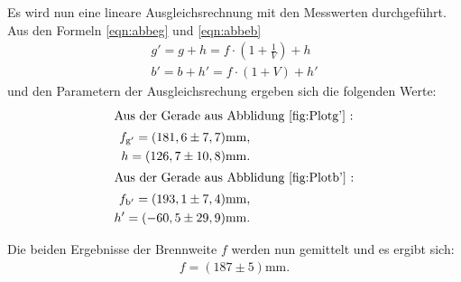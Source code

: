 Es wird nun eine lineare Ausgleichsrechnung mit den Messwerten durchgeführt.
Aus den Formeln  \eqref{eqn:abbeg} und \eqref{eqn:abbeb}
\begin{align}
  g'=g+h=f\cdot \left(1+\frac{1}{V}\right)+h \label{eqn:abbeg}\\
  b'=b+h'=f\cdot \left(1+V\right)+h' \label{eqn:abbeb}
\end{align}
und den Parametern der
Ausgleichsrechung ergeben sich die folgenden Werte:
\begin{align*}
\intertext{Aus der Gerade aus Abblidung \ref{fig:Plotg'} :}
  f_\mathrm{g'}=(181,6\pm7,7)\si{\milli\meter}, \\
  h=(126,7\pm10,8)\si{\milli\meter}.\\
\intertext{Aus der Gerade aus Abblidung \ref{fig:Plotb'} :}
f_\mathrm{b'}=(193,1\pm7,4)\si{\milli\meter}, \\
  h'=(-60,5\pm29,9)\si{\milli\meter}. \\
\end{align*}

Die beiden Ergebnisse der Brennweite $f$
werden nun gemittelt und es ergibt sich:
\begin{align*}
  f=(187\pm5)\si{\milli\meter}.
\end{align*}
